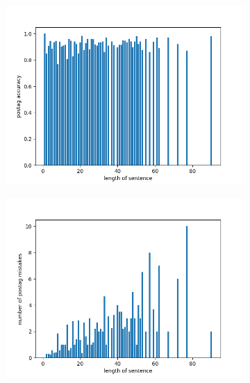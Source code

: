 \documentclass[8pt,twocolumn,letterpaper]{article}
\begin{document}
\begin{figure}[h!]
    \centering
      \begin{subfigure}[b]{0.8\linewidth}
        \includegraphics[width=\linewidth]{report/1.png}
    \end{subfigure}
    \begin{subfigure}[b]{0.8\linewidth}
        \includegraphics[width=\linewidth]{report/2.png}
    \end{subfigure}
     \begin{subfigure}[b]{0.8\linewidth}

\end{subfigure}
\end{figure}
\end{document}
